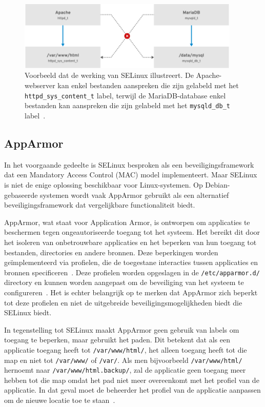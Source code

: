 \begin{figure}[h!]
    \begin{center}
        \includegraphics[width=300pt]
        {./graphics/linux/selinux-example.png}
        \caption[Voorbeeld van SELinux werking.]{\label{fig:sleinux-example}Voorbeeld dat de werking van SELinux illustreert. De Apache-webserver kan enkel bestanden aanspreken die zijn gelabeld met het \texttt{httpd\_sys\_content\_t} label, terwijl de MariaDB-database enkel bestanden kan aanspreken die zijn gelabeld met het \texttt{mysqld\_db\_t} label~\autocite{selinux-rhel8}.}
    \end{center}
\end{figure}

\subsection{AppArmor}
\label{linux_apparmor}

In het voorgaande gedeelte is SELinux besproken als een beveiligingsframework dat een Mandatory Access Control (MAC) model implementeert.
Maar SELinux is niet de enige oplossing beschikbaar voor Linux-systemen.
Op Debian-gebaseerde systemen wordt vaak AppArmor gebruikt als een alternatief beveiligingsframework dat vergelijkbare functionaliteit biedt.

AppArmor, wat staat voor Application Armor, is ontworpen om applicaties te beschermen tegen ongeautoriseerde toegang tot het systeem.
Het bereikt dit door het isoleren van onbetrouwbare applicaties en het beperken van hun toegang tot bestanden, directories en andere bronnen.
Deze beperkingen worden ge\"implementeerd via profielen, die de toegestane interacties tussen applicaties en bronnen specificeren~\autocite{gruenbacher2007apparmor}.
Deze profielen worden opgeslagen in de \texttt{/etc/apparmor.d/} directory en kunnen worden aangepast om de beveiliging van het systeem te configureren~\autocite{apparmor-ubuntu}.
Het is echter belangrijk op te merken dat AppArmor zich beperkt tot deze profielen en niet de uitgebreide beveiligingsmogelijkheden biedt die SELinux biedt.

In tegenstelling tot SELinux maakt AppArmor geen gebruik van labels om toegang te beperken, maar gebruikt het paden.
Dit betekent dat als een applicatie toegang heeft tot \texttt{/var/www/html/}, het alleen toegang heeft tot die map en niet tot \texttt{/var/www/} of \texttt{/var/}.
Als men bijvoorbeeld \texttt{/var/www/html/} hernoemt naar \texttt{/var/www/html.backup/}, zal de applicatie geen toegang meer hebben tot die map omdat het pad niet meer overeenkomt met het profiel van de applicatie.
In dat geval moet de beheerder het profiel van de applicatie aanpassen om de nieuwe locatie toe te staan~\autocite{gruenbacher2007apparmor}.
